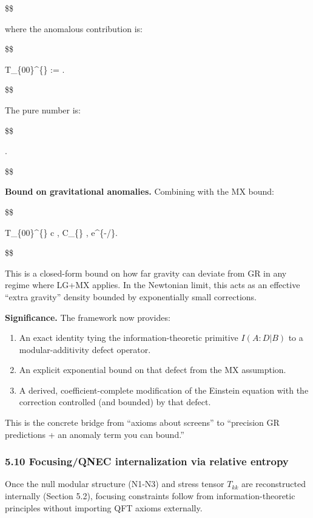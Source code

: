 \documentclass[11pt,a4paper]{article}
\theoremstyle{remark}
\providecommand{\tightlist}{%
  \setlength{\itemsep}{0pt}\setlength{\parskip}{0pt}}
\begin{document}
\$\$

where the anomalous contribution is:

\$\$

\langle T\_\{00\}\^{}\{\} \rangle
:=  \cdot {}.

\$\$

The pure number is:

\$\$

 .

\$\$

\textbf{Bound on gravitational anomalies.} Combining with the MX bound:

\$\$

\left\textbar{} \langle T\_\{00\}\^{}\{\} \rangle \right\textbar{}
\lesssim {} \cdot {} \cdot
c , \textbar{}\partial C\textbar\_\{\} , e\^{}\{-\delta/\xi\}.

\$\$

This is a closed-form bound on how far gravity can deviate from GR in any
regime where LG+MX applies. In the Newtonian limit, this acts as an effective
``extra gravity'' density bounded by exponentially small corrections.

\textbf{Significance.} The framework now provides:

\begin{enumerate}
\def\labelenumi{\arabic{enumi}.}
\tightlist
\item
  An exact identity tying the information-theoretic primitive \(I(A:D|B)\) to a
  modular-additivity defect operator.
\item
  An explicit exponential bound on that defect from the MX assumption.
\item
  A derived, coefficient-complete modification of the Einstein equation with
  the correction controlled (and bounded) by that defect.
\end{enumerate}

This is the concrete bridge from ``axioms about screens'' to ``precision GR
predictions + an anomaly term you can bound.''

\subsubsection{5.10 Focusing/QNEC internalization via relative entropy}\label{focusingqnec-internalization-via-relative-entropy}

Once the null modular structure (N1-N3) and stress tensor \(T_{kk}\) are
reconstructed internally (Section 5.2), focusing constraints follow from
information-theoretic principles without importing QFT axioms externally.
\end{document}
